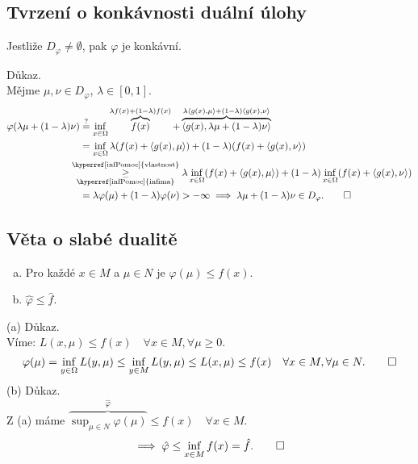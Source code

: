 \subsection{Tvrzení o konkávnosti duální úlohy}
Jestliže $D_\varphi \not= \emptyset$, pak $\varphi$ je konkávní.

Důkaz.\\
Mějme $\mu, \nu \in D_\varphi$, $\lambda \in [0,1]$.
\begin{align*}
    \varphi(\lambda \mu + (1-\lambda)\nu) &\overset{\text{?}}{=} \inf_{x\in \Omega} \overbrace{f(x)}^{\lambda f(x) + 
    (1-\lambda)f(x)} + \overbrace{\langle g(x), \lambda \mu + (1-\lambda)\nu\rangle}^{\lambda \langle g(x), \mu\rangle + 
    (1-\lambda)\langle g(x), \nu\rangle} \\
    &= \inf_{x\in \Omega} \lambda(f(x) + \langle g(x), \mu\rangle) + (1-\lambda)(f(x)+\langle g(x), \nu\rangle) \\
    &\hspace*{-1.1em}\underset{\text{\hyperref[infPomoc]{infima}}}{\overset{\text{\hyperref[infPomoc]{vlastnost}}}{\geq}} 
    \lambda \inf_{x\in \Omega} (f(x) + \langle g(x), \mu\rangle) + (1 - \lambda) \inf_{x\in \Omega} (f(x) + \langle g(x), 
    \nu\rangle) \\
    &= \lambda \varphi(\mu) + (1-\lambda) \varphi(\nu) > - \infty \implies \lambda \mu + (1-\lambda)\nu \in D_\varphi. \qed
\end{align*}

\subsection{Věta o slabé dualitě}\label{slabDual}
\begin{enumerate}[(a)]
    \item Pro každé $x \in M$ a $\mu \in N$ je $\varphi(\mu) \leq f(x)$.
    \item $\hat \varphi \leq \hat f$.
\end{enumerate}
(a) Důkaz.\\
Víme: $L(x, \mu) \leq f(x) \quad \forall x \in M, \forall \mu \geq 0$.
\[
    \varphi(\mu) = \inf_{y \in \Omega} L(y, \mu) \leq \inf_{y \in M} L(y, \mu) \leq L(x, \mu) \leq f(x) \quad 
    \forall x \in M, \forall \mu \in N. \qed
\]
(b) Důkaz.\\
Z (a) máme $\overbrace{\sup_{\mu \in N} \varphi(\mu)}^{\hat \varphi} \leq f(x) \quad \forall x \in M$.
\[
    \implies \hat \varphi \leq \inf_{x \in M}f(x) = \hat f. \qed
\]

